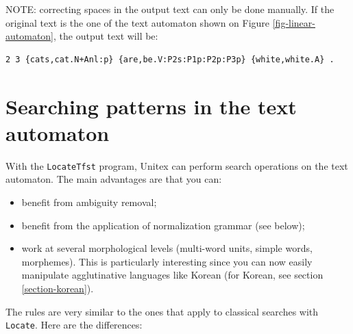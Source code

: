 \bigskip
\noindent NOTE: correcting spaces in the output text can only be done manually. If the
original text is the one of the text automaton shown on Figure \ref{fig-linear-automaton},
the output text will be:

\begin{verbatim}
2 3 {cats,cat.N+Anl:p} {are,be.V:P2s:P1p:P2p:P3p} {white,white.A} .
\end{verbatim}


\section{Searching patterns in the text automaton}
\label{section-locate-tfst}
With the \verb+LocateTfst+ program, Unitex can perform search operations on the
text automaton. The main advantages are that you can:
\begin{itemize}
    \item benefit from ambiguity removal;
    \item benefit from the application of normalization grammar (see below);
    \item work at several morphological levels (multi-word units, simple words,
    morphemes). This is particularly interesting since you can now
    easily manipulate agglutinative languages like Korean (for Korean, see
    section \ref{section-korean}).
   
\end{itemize}

 
\bigskip
\noindent The rules are very similar to the ones that apply to classical
searches with \verb+Locate+. Here are the differences:


